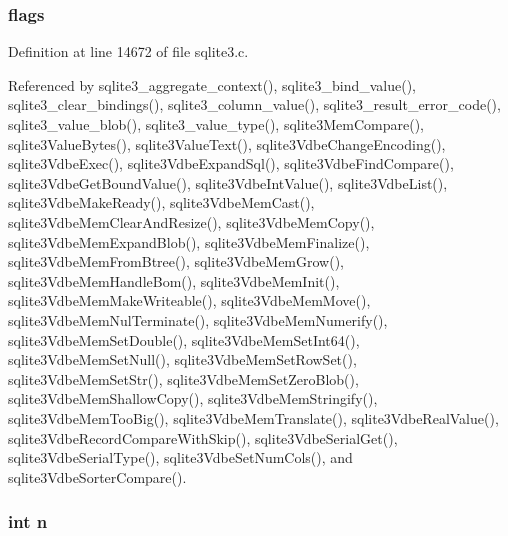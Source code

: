 \hypertarget{struct_mem_a687c73b55452210faa467db4d365a3ee}{}
\subsubsection[{flags}]{ flags}\label{struct_mem_a687c73b55452210faa467db4d365a3ee}


Definition at line 14672 of file sqlite3.\+c.



Referenced by sqlite3\+\_\+aggregate\+\_\+context(), sqlite3\+\_\+bind\+\_\+value(), sqlite3\+\_\+clear\+\_\+bindings(), sqlite3\+\_\+column\+\_\+value(), sqlite3\+\_\+result\+\_\+error\+\_\+code(), sqlite3\+\_\+value\+\_\+blob(), sqlite3\+\_\+value\+\_\+type(), sqlite3\+Mem\+Compare(), sqlite3\+Value\+Bytes(), sqlite3\+Value\+Text(), sqlite3\+Vdbe\+Change\+Encoding(), sqlite3\+Vdbe\+Exec(), sqlite3\+Vdbe\+Expand\+Sql(), sqlite3\+Vdbe\+Find\+Compare(), sqlite3\+Vdbe\+Get\+Bound\+Value(), sqlite3\+Vdbe\+Int\+Value(), sqlite3\+Vdbe\+List(), sqlite3\+Vdbe\+Make\+Ready(), sqlite3\+Vdbe\+Mem\+Cast(), sqlite3\+Vdbe\+Mem\+Clear\+And\+Resize(), sqlite3\+Vdbe\+Mem\+Copy(), sqlite3\+Vdbe\+Mem\+Expand\+Blob(), sqlite3\+Vdbe\+Mem\+Finalize(), sqlite3\+Vdbe\+Mem\+From\+Btree(), sqlite3\+Vdbe\+Mem\+Grow(), sqlite3\+Vdbe\+Mem\+Handle\+Bom(), sqlite3\+Vdbe\+Mem\+Init(), sqlite3\+Vdbe\+Mem\+Make\+Writeable(), sqlite3\+Vdbe\+Mem\+Move(), sqlite3\+Vdbe\+Mem\+Nul\+Terminate(), sqlite3\+Vdbe\+Mem\+Numerify(), sqlite3\+Vdbe\+Mem\+Set\+Double(), sqlite3\+Vdbe\+Mem\+Set\+Int64(), sqlite3\+Vdbe\+Mem\+Set\+Null(), sqlite3\+Vdbe\+Mem\+Set\+Row\+Set(), sqlite3\+Vdbe\+Mem\+Set\+Str(), sqlite3\+Vdbe\+Mem\+Set\+Zero\+Blob(), sqlite3\+Vdbe\+Mem\+Shallow\+Copy(), sqlite3\+Vdbe\+Mem\+Stringify(), sqlite3\+Vdbe\+Mem\+Too\+Big(), sqlite3\+Vdbe\+Mem\+Translate(), sqlite3\+Vdbe\+Real\+Value(), sqlite3\+Vdbe\+Record\+Compare\+With\+Skip(), sqlite3\+Vdbe\+Serial\+Get(), sqlite3\+Vdbe\+Serial\+Type(), sqlite3\+Vdbe\+Set\+Num\+Cols(), and sqlite3\+Vdbe\+Sorter\+Compare().

\hypertarget{struct_mem_a76f11d9a0a47b94f72c2d0e77fb32240}{}
\subsubsection[{n}]{\setlength{\rightskip}{0pt plus 5cm}int n}\label{struct_mem_a76f11d9a0a47b94f72c2d0e77fb32240}



